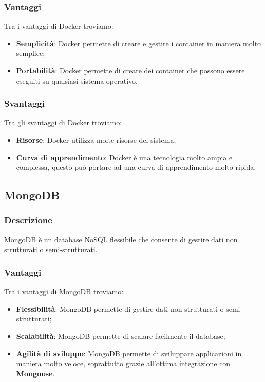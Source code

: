 \subsubsection*{Vantaggi}
Tra i vantaggi di Docker troviamo:
\begin{itemize}
    \item \textbf{Semplicità}: Docker permette di creare e gestire i container in maniera molto semplice;
    \item \textbf{Portabilità}: Docker permette di creare dei container che possono essere eseguiti su qualsiasi sistema operativo.
\end{itemize}

\subsubsection*{Svantaggi}
Tra gli svantaggi di Docker troviamo:
\begin{itemize}
    \item \textbf{Risorse}: Docker utilizza molte risorse del sistema;
    \item \textbf{Curva di apprendimento}: Docker è una tecnologia molto ampia e complessa, questo può portare ad una curva di apprendimento molto ripida.
\end{itemize}


\subsection*{MongoDB}

\subsubsection*{Descrizione}
MongoDB è un database NoSQL flessibile che consente di gestire dati non strutturati o semi-strutturati. 

\subsubsection*{Vantaggi}
Tra i vantaggi di MongoDB troviamo:
\begin{itemize}
    \item \textbf{Flessibilità}: MongoDB permette di gestire dati non strutturati o semi-strutturati;
    \item \textbf{Scalabilità}: MongoDB permette di scalare facilmente il database;
    \item \textbf{Agilità di sviluppo}: MongoDB permette di sviluppare applicazioni in maniera molto veloce, soprattutto
    grazie all'ottima integrazione con \textbf{Mongoose}.
\end{itemize}

